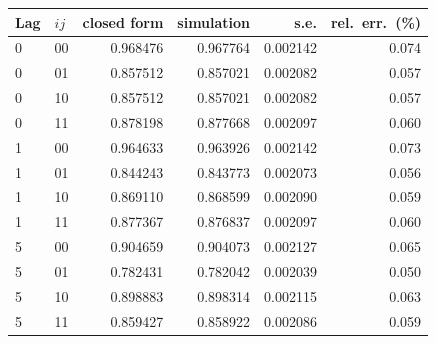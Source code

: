 \begin{tabular}{llrrrr}
\toprule
Lag & $ij$ & closed form & simulation & s.e. & rel.\ err.\ (\%)\\
\midrule
0 & 00 & 0.968476 & 0.967764 & 0.002142 & 0.074\\
0 & 01 & 0.857512 & 0.857021 & 0.002082 & 0.057\\
0 & 10 & 0.857512 & 0.857021 & 0.002082 & 0.057\\
0 & 11 & 0.878198 & 0.877668 & 0.002097 & 0.060\\
1 & 00 & 0.964633 & 0.963926 & 0.002142 & 0.073\\
1 & 01 & 0.844243 & 0.843773 & 0.002073 & 0.056\\
1 & 10 & 0.869110 & 0.868599 & 0.002090 & 0.059\\
1 & 11 & 0.877367 & 0.876837 & 0.002097 & 0.060\\
5 & 00 & 0.904659 & 0.904073 & 0.002127 & 0.065\\
5 & 01 & 0.782431 & 0.782042 & 0.002039 & 0.050\\
5 & 10 & 0.898883 & 0.898314 & 0.002115 & 0.063\\
5 & 11 & 0.859427 & 0.858922 & 0.002086 & 0.059\\
\bottomrule
\end{tabular}
